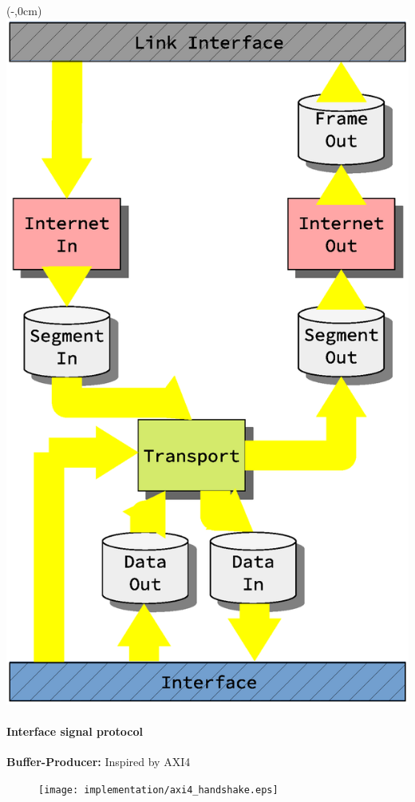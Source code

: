 \begin{frame}[fragile]
    \begin{textblock*}{\displayThumbnail}(\paperwidth-\displayThumbnail-0.2cm,0cm) %
        \colorbox{white}{\includegraphics[width=\textwidth]{implementation/design_2_busses.eps}}
    \end{textblock*}
    \frametitle{\ImplementationTitle}
    \framesubtitle{Interface signal protocol}
    \textbf{Buffer-Producer:} Inspired by AXI4\\
    \begin{figure}
                \texttt{[image: implementation/axi4\_handshake.eps]}

        \end{figure}
\end{frame}


